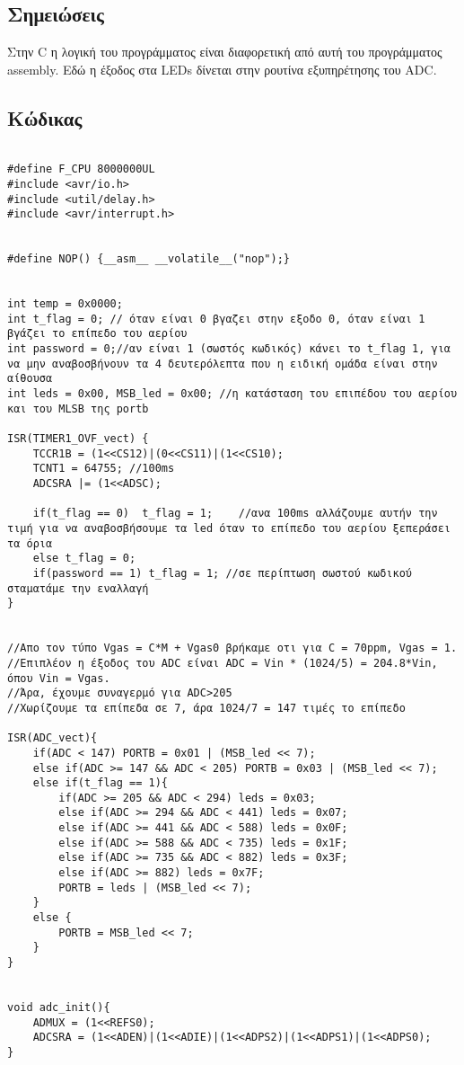 \documentclass{article}
\begin{document}
\subsection*{Σημειώσεις}
Στην C η λογική του προγράμματος είναι διαφορετική από αυτή του προγράμματος assembly. Εδώ η έξοδος στα LEDs δίνεται στην ρουτίνα εξυπηρέτησης του ADC.
\subsection*{Κώδικας}

\begin{verbatim}

#define F_CPU 8000000UL
#include <avr/io.h>
#include <util/delay.h>
#include <avr/interrupt.h>


#define NOP() {__asm__ __volatile__("nop");}
	

int temp = 0x0000;
int t_flag = 0; // όταν είναι 0 βγαζει στην εξοδο 0, όταν είναι 1 βγάζει το επίπεδο του αερίου
int password = 0;//αν είναι 1 (σωστός κωδικός) κάνει το t_flag 1, για να μην αναβοσβήνουν τα 4 δευτερόλεπτα που η ειδική ομάδα είναι στην αίθουσα
int leds = 0x00, MSB_led = 0x00; //η κατάσταση του επιπέδου του αερίου και του MLSB της portb
 
ISR(TIMER1_OVF_vect) {
	TCCR1B = (1<<CS12)|(0<<CS11)|(1<<CS10);
	TCNT1 = 64755; //100ms
	ADCSRA |= (1<<ADSC);
	
	if(t_flag == 0)  t_flag = 1;	//ανα 100ms αλλάζουμε αυτήν την τιμή για να αναβοσβήσουμε τα led όταν το επίπεδο του αερίου ξεπεράσει τα όρια
	else t_flag = 0;
	if(password == 1) t_flag = 1; //σε περίπτωση σωστού κωδικού σταματάμε την εναλλαγή
}


//Απο τον τύπο Vgas = C*M + Vgas0 βρήκαμε οτι για C = 70ppm, Vgas = 1. 
//Επιπλέον η έξοδος του ADC είναι ADC = Vin * (1024/5) = 204.8*Vin, όπου Vin = Vgas. 
//Άρα, έχουμε συναγερμό για ADC>205
//Χωρίζουμε τα επίπεδα σε 7, άρα 1024/7 = 147 τιμές το επίπεδο

ISR(ADC_vect){
	if(ADC < 147) PORTB = 0x01 | (MSB_led << 7);
	else if(ADC >= 147 && ADC < 205) PORTB = 0x03 | (MSB_led << 7);
	else if(t_flag == 1){
		if(ADC >= 205 && ADC < 294) leds = 0x03;
		else if(ADC >= 294 && ADC < 441) leds = 0x07; 
		else if(ADC >= 441 && ADC < 588) leds = 0x0F;
		else if(ADC >= 588 && ADC < 735) leds = 0x1F;
		else if(ADC >= 735 && ADC < 882) leds = 0x3F;
		else if(ADC >= 882) leds = 0x7F;
		PORTB = leds | (MSB_led << 7);
	}
	else {
		PORTB = MSB_led << 7;
	}
}


void adc_init(){
	ADMUX = (1<<REFS0);
	ADCSRA = (1<<ADEN)|(1<<ADIE)|(1<<ADPS2)|(1<<ADPS1)|(1<<ADPS0);
}


\end{verbatim}
\end{document}
